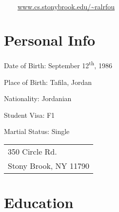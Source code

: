 \documentclass[a4paper, oneside, final]{scrartcl}
\begin{document}
      \begin{center}
      \textsc{\Huge{}}\\

      \href{mailto:ralrfou@cs.stonybrook.edu}{} \,\,\,\,\,\,\,\,\,\, \url{www.cs.stonybrook.edu/~ralrfou} \\
            \end{center}
\section{Personal Info}
\vspace{-14pt}
\begin{compactitem}
\begin{multicols}{2}
      \item Date of Birth: September 12\textsuperscript{th}, 1986 
      \item Place of Birth: Tafila, Jordan 
      \item Nationality: Jordanian
      \item Student Visa: F1
      \item Martial Status: Single \\
	\item 
 \begin{tabular}[t]{l}350 Circle Rd. \\
Stony Brook,  NY 11790
 \end{tabular}
\end{multicols}
\end{compactitem}
\vspace{-4pt}

\section{Education}
\end{document}
